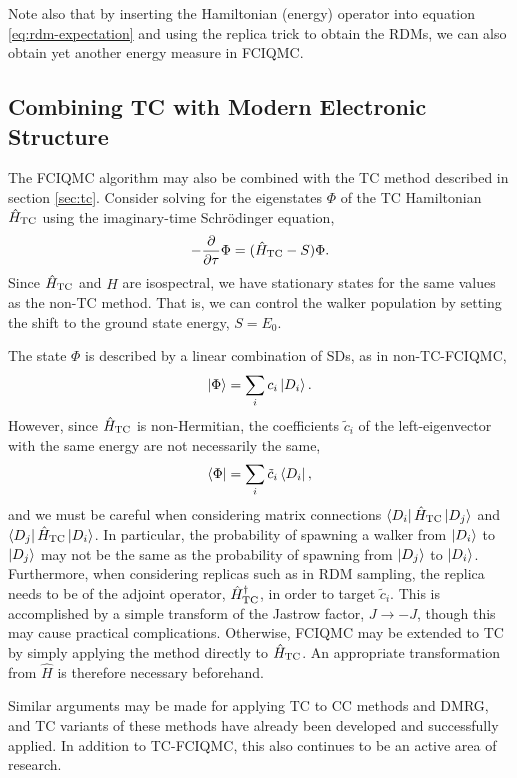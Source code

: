 Note also that by inserting the Hamiltonian (energy) operator into equation \ref{eq:rdm-expectation} and using the replica trick to obtain the RDMs, we can also obtain yet another energy measure in FCIQMC.

\subsection{Combining TC with Modern Electronic Structure}
\label{sec:tc-fciqmc}

The \gls{FCIQMC} algorithm may also be combined with the \gls{TC} method described in section \ref{sec:tc}.\supercite{luoCombining2018} Consider solving for the eigenstates $\Phi$ of the TC Hamiltonian $\hat H_\mathrm{TC}$ using the imaginary-time Schr\"odinger equation,
\begin{equation}
    -\frac{\partial}{\partial\tau}\Phi = (\hat H_\mathrm{TC} - S)\Phi.
\end{equation}
Since $\hat H_\mathrm{TC}$ and $\hat H$ are isospectral, we have stationary states for the same values as the non-TC method. That is, we can control the walker population by setting the shift to the ground state energy, $S=E_0$.

The state $\Phi$ is described by a linear combination of \glspl{SD}, as in non-TC-FCIQMC,
\begin{equation}
    \ket\Phi = \sum_i c_i \ket{D_i}.
\end{equation}
However, since $\hat H_\mathrm{TC}$ is non-Hermitian, the coefficients $\tilde c_i$ of the left-eigenvector with the same energy are not necessarily the same,
\begin{equation}
    \bra\Phi = \sum_i \tilde c_i \bra{D_i},
\end{equation}
and we must be careful when considering matrix connections $\bra{D_i}\hat H_\mathrm{TC}\ket{D_j}$ and $\bra{D_j}\hat H_\mathrm{TC}\ket{D_i}$. In particular, the probability of spawning a walker from $\ket{D_i}$ to $\ket{D_j}$ may not be the same as the probability of spawning from $\ket{D_j}$ to $\ket{D_i}$. Furthermore, when considering replicas such as in RDM sampling, the replica needs to be of the adjoint operator, $\hat H_\mathrm{TC}^\dag$, in order to target $\tilde c_i$. This is accomplished by a simple transform of the Jastrow factor, $J\to -J$, though this may cause practical complications. Otherwise, \gls{FCIQMC} may be extended to \gls{TC} by simply applying the method directly to $\hat H_\mathrm{TC}$. An appropriate transformation from $\hat H$ is therefore necessary beforehand.

Similar arguments may be made for applying \gls{TC} to \gls{CC} methods\supercite{schraivogelTranscorrelated2021,schraivogelTranscorrelated2023} and \gls{DMRG},\supercite{baiardiTranscorrelated2020} and \gls{TC} variants of these methods have already been developed and successfully applied. In addition to TC-FCIQMC, this also continues to be an active area of research.
